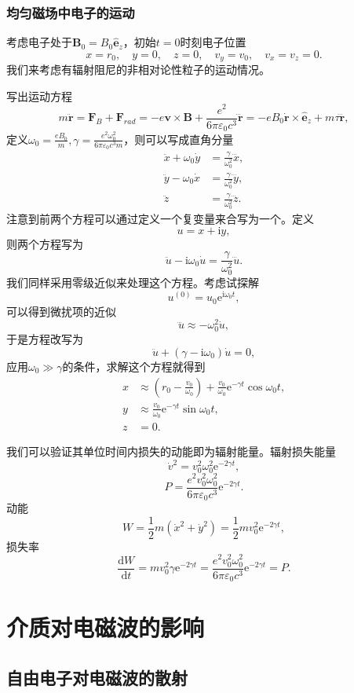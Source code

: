 \documentclass[UTF8]{ctexbook}
\newcommand{\e}{\mathrm{e}}
\renewcommand{\d}{\mathrm{d}}
\renewcommand{\b}{\boldsymbol}
\renewcommand{\i}{\mathrm{i}}
\numberwithin{equation}{chapter}
\begin{document}
	\subsection{均匀磁场中电子的运动}
	
	考虑电子处于$\b{B}_0=B_0\hat{\b{e}}_z$，初始$t=0$时刻电子位置
	\[x=r_0,\quad y=0,\quad z=0,\quad v_y=v_0,\quad v_x=v_z=0.\]
	我们来考虑有辐射阻尼的非相对论性粒子的运动情况。
	
	写出运动方程
	\[m\ddot{\b{r}}=\b{F}_B+\b{F}_{rad}=-e\b{v}\times\b{B}+\frac{e^2}{6\pi\varepsilon_0 c^3}\dddot{\b{r}}=-eB_0\dot{\b{r}}\times\hat{\b{e}}_z+m\tau\dddot{\b{r}},\]
	定义$\omega_0=\frac{eB_0}{m},\gamma=\frac{e^2\omega_0^2}{6\pi\varepsilon_0 c^3 m}$，则可以写成直角分量
	\begin{align*}
		\ddot{x}+\omega_0\dot{y}&=\frac{\gamma}{\omega_0^2}\dddot{x},\\
		\ddot{y}-\omega_0 \dot{x}&=\frac{\gamma}{\omega_0^2}\dddot{y},\\
		\ddot{z}&=\frac{\gamma}{\omega_0^2}\dddot{z}.
	\end{align*}
	注意到前两个方程可以通过定义一个复变量来合写为一个。定义
	\[u=x+\i y,\]
	则两个方程写为
	\[\ddot{u}-\i\omega_0 \dot{u}=\frac{\gamma}{\omega_0^2}\dddot{u}.\]
	我们同样采用零级近似来处理这个方程。考虑试探解
	\[u^{(0)}=u_0\e^{\i\omega_0 t},\]
	可以得到微扰项的近似
	\[\dddot{u}\approx -\omega_0^2\dot{u},\]
	于是方程改写为
	\[\ddot{u}+(\gamma-\i\omega_0)\dot{u}=0,\]
	应用$\omega_0 \gg \gamma$的条件，求解这个方程就得到
	\begin{align*}
		x&\approx \left(r_0-\frac{v_0}{\omega_0}\right)+\frac{v_0}{\omega_0}\e^{-\gamma t}\cos\omega_0 t,\\
		y&\approx \frac{v_0}{\omega_0}\e^{-\gamma t}\sin\omega_0 t, \\
		z&=0.
	\end{align*}
	
	我们可以验证其单位时间内损失的动能即为辐射能量。辐射损失能量
	\[\dot{v}^2=v_0^2\omega_0^2\e^{-2\gamma t},\]
	\[P=\frac{e^2v_0^2\omega_0^2}{6\pi\varepsilon_0 c^3}\e^{-2\gamma t}.\]
	动能
	\[W=\frac{1}{2}m(\dot{x}^2+\dot{y}^2)=\frac{1}{2}mv_0^2\e^{-2\gamma t},\]
	损失率
	\[\frac{\d W}{\d t}=mv_0^2\gamma\e^{-2\gamma t}=\frac{e^2v_0^2\omega_0^2}{6\pi\varepsilon_0 c^3}\e^{-2\gamma t}=P.\]
	
	\chapter{介质对电磁波的影响}
	
	\section{自由电子对电磁波的散射}
	
\end{document}

